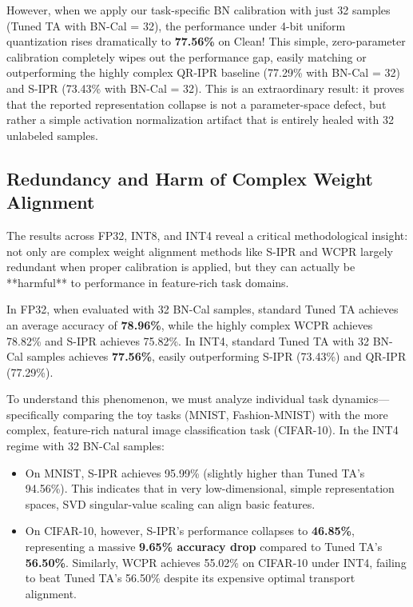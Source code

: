 \documentclass{article}
\theoremstyle{plain}
\theoremstyle{definition}
\theoremstyle{remark}
\begin{document}
However, when we apply our task-specific BN calibration with just 32 samples (Tuned TA with BN-Cal = 32), the performance under 4-bit uniform quantization rises dramatically to \textbf{77.56\%} on Clean! This simple, zero-parameter calibration completely wipes out the performance gap, easily matching or outperforming the highly complex QR-IPR baseline (77.29\% with BN-Cal = 32) and S-IPR (73.43\% with BN-Cal = 32). This is an extraordinary result: it proves that the reported representation collapse is not a parameter-space defect, but rather a simple activation normalization artifact that is entirely healed with 32 unlabeled samples.

\subsection{Redundancy and Harm of Complex Weight Alignment}
The results across FP32, INT8, and INT4 reveal a critical methodological insight: not only are complex weight alignment methods like S-IPR \cite{paper5} and WCPR \cite{paper9} largely redundant when proper calibration is applied, but they can actually be **harmful** to performance in feature-rich task domains. 

In FP32, when evaluated with 32 BN-Cal samples, standard Tuned TA achieves an average accuracy of \textbf{78.96\%}, while the highly complex WCPR achieves 78.82\% and S-IPR achieves 75.82\%. In INT4, standard Tuned TA with 32 BN-Cal samples achieves \textbf{77.56\%}, easily outperforming S-IPR (73.43\%) and QR-IPR (77.29\%).

To understand this phenomenon, we must analyze individual task dynamics—specifically comparing the toy tasks (MNIST, Fashion-MNIST) with the more complex, feature-rich natural image classification task (CIFAR-10). In the INT4 regime with 32 BN-Cal samples:
\begin{itemize}
    \item On MNIST, S-IPR achieves 95.99\% (slightly higher than Tuned TA's 94.56\%). This indicates that in very low-dimensional, simple representation spaces, SVD singular-value scaling can align basic features.
    \item On CIFAR-10, however, S-IPR's performance collapses to \textbf{46.85\%}, representing a massive \textbf{9.65\% accuracy drop} compared to Tuned TA's \textbf{56.50\%}. Similarly, WCPR achieves 55.02\% on CIFAR-10 under INT4, failing to beat Tuned TA's 56.50\% despite its expensive optimal transport alignment.
\end{itemize}
\end{document}
